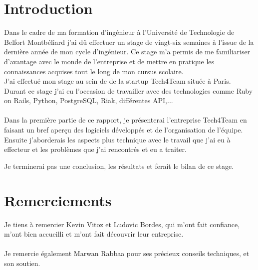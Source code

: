 
\newpage

\section*{Introduction}

Dans le cadre de ma formation d’ingénieur à l’Université de Technologie de Belfort Montbéliard j’ai dû effectuer un stage de vingt-six semaines à l’issue de la dernière année de mon cycle d’ingénieur. Ce stage m'a permis de me familiariser d'avantage avec le monde de l’entreprise et de mettre en pratique les connaissances acquises tout le long de mon cursus scolaire.
\\
J’ai effectué mon stage au sein de de la startup Tech4Team située à Paris.
\\ 

\indent Durant ce stage j'ai eu l'occasion de travailler avec des technologies comme Ruby on Rails, Python, PostgreSQL, Riak, différentes API,...
\\ \\
Dans la première partie de ce rapport, je présenterai l’entreprise Tech4Team en faisant un bref aperçu des logiciels développés et de l'organisation de l'équipe.
Ensuite j'aborderais les aspects plus technique avec le travail que j'ai eu à effecteur et les problèmes que j'ai rencontrés et eu a traiter.

Je terminerai pas une conclusion, les résultats et ferait le bilan de ce stage.


%
%
%

\newpage
\section*{Remerciements}
Je tiens à remercier Kevin Vitoz et Ludovic Bordes, qui m'ont fait confiance, m'ont bien accueilli et m'ont fait découvrir leur entreprise.
\\ \\ 
Je remercie également Marwan Rabbaa pour ses précieux conseils techniques, et son soutien.